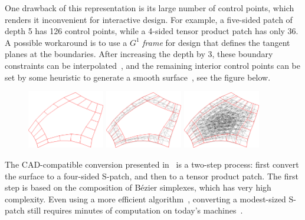 \documentclass{article}
\begin{document}
One drawback of this representation is its large number of control points, which renders it
inconvenient for interactive design. For example, a five-sided patch of depth 5 has 126 control
points, while a 4-sided tensor product patch has only 36. A possible workaround is to use a
$G^1$ \emph{frame} for design that defines the tangent planes at the boundaries.
After increasing the depth by 3, these boundary constraints can be interpolated~\cite{spatch2},
and the remaining interior control points can be set by some heuristic to generate a smooth
surface~\cite{salvi-kepaf}, see the figure below.
\begin{figure}[h!]
  \centering
  \includegraphics[width = 0.3\textwidth]{images/5-5-bezier-ribbon.png}
  \hfill
  \includegraphics[width = 0.3\textwidth]{images/5-5-cnet-ribbon.png}
  \hfill
  \includegraphics[width = 0.3\textwidth]{images/5-5-cnet-full.png}
\end{figure}

The CAD-compatible conversion presented in~\cite{spatch1} is a two-step process:
first convert the surface to a
four-sided S-patch, and then to a tensor product patch. The first step is based on the
composition of B\'ezier simplexes, which has very high complexity.
Even using a more efficient algorithm~\cite{simplex2}, converting a modest-sized S-patch
still requires minutes of computation on today's machines~\cite{salvi-wait}.
\end{document}
